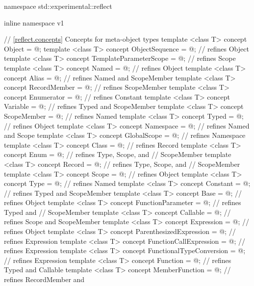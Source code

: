 \begin{std.txt}\color{addclr}
\begin{codeblock}
namespace std::experimental::reflect {
inline namespace v1 {

// \ref{reflect.concepts} Concepts for meta-object types
template <class T> concept Object = @\seebelow@;
template <class T> concept ObjectSequence = @\seebelow@; // refines Object
template <class T> concept TemplateParameterScope = @\seebelow@; // refines Scope
template <class T> concept Named = @\seebelow@;          // refines Object
template <class T> concept Alias = @\seebelow@;          // refines Named and ScopeMember
template <class T> concept RecordMember = @\seebelow@;   // refines ScopeMember
template <class T> concept Enumerator = @\seebelow@;     // refines Constant
template <class T> concept Variable = @\seebelow@;       // refines Typed and ScopeMember
template <class T> concept ScopeMember = @\seebelow@;    // refines Named
template <class T> concept Typed = @\seebelow@;          // refines Object
template <class T> concept Namespace = @\seebelow@;      // refines Named and Scope
template <class T> concept GlobalScope = @\seebelow@;    // refines Namespace
template <class T> concept Class = @\seebelow@;          // refines Record
template <class T> concept Enum = @\seebelow@;           // refines Type, Scope, and
                                                       // ScopeMember
template <class T> concept Record = @\seebelow@;         // refines Type, Scope, and
                                                       // ScopeMember
template <class T> concept Scope = @\seebelow@;          // refines Object
template <class T> concept Type = @\seebelow@;           // refines Named
template <class T> concept Constant = @\seebelow@;       // refines Typed and ScopeMember
template <class T> concept Base = @\seebelow@;           // refines Object
template <class T> concept FunctionParameter = @\seebelow@; // refines Typed and
                                                          // ScopeMember
template <class T> concept Callable = @\seebelow@;       // refines Scope and ScopeMember
template <class T> concept Expression = @\seebelow@;     // refines Object
template <class T> concept ParenthesizedExpression = @\seebelow@;  // refines Expression
template <class T> concept FunctionCallExpression = @\seebelow@;   // refines Expression
template <class T> concept FunctionalTypeConversion = @\seebelow@; // refines Expression
template <class T> concept Function = @\seebelow@;       // refines Typed and Callable
template <class T> concept MemberFunction = @\seebelow@; // refines RecordMember and
}}
\end{codeblock}
\end{std.txt}
